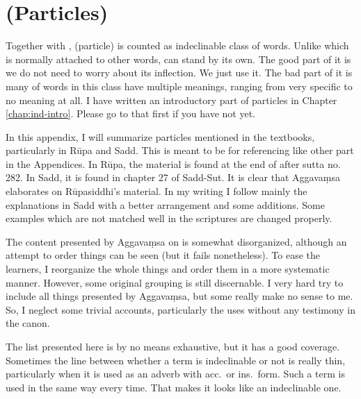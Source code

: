 \chapter{ (Particles)}\label{chap:nipata}

Together with ,  (particle) is counted as indeclinable class of words. Unlike  which is normally attached to other words,  can stand by its own. The good part of it is we do not need to worry about its inflection. We just use it. The bad part of it is many of words in this class have multiple meanings, ranging from very specific to no meaning at all. I have written an introductory part of particles in Chapter \ref{chap:ind-intro}. Please go to that first if you have not yet.

In this appendix, I will summarize particles mentioned in the textbooks, particularly in R\=upa and Sadd. This is meant to be for referencing like other part in the Appendices. In R\=upa, the material is found at the end of  after sutta no.\,282. In Sadd, it is found in chapter 27 of Sadd-Sut. It is clear that Aggava\d msa elaborates on R\=upasiddhi's material. In my writing I follow mainly the explanations in Sadd with a better arrangement and some additions. Some examples which are not matched well in the scriptures are changed properly.

The content presented by Aggava\d msa on  is somewhat disorganized, although an attempt to order things can be seen (but it fails nonetheless). To ease the learners, I reorganize the whole things and order them in a more systematic manner. However, some original grouping is still discernable. I very hard try to include all things presented by Aggava\d msa, but some really make no sense to me. So, I neglect some trivial accounts, particularly the uses without any testimony in the canon.

The list presented here is by no means exhaustive, but it has a good coverage. Sometimes the line between whether a term is indeclinable or not is really thin, particularly when it is used as an adverb with acc.\ or ins.\ form. Such a term is used in the same way every time. That makes it looks like an indeclinable one.

